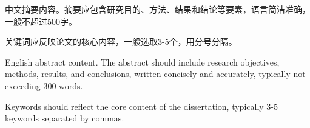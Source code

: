 \begin{cabstract}
中文摘要内容。摘要应包含研究目的、方法、结果和结论等要素，语言简洁准确，一般不超过500字。

关键词应反映论文的核心内容，一般选取3-5个，用分号分隔。
\end{cabstract}

\begin{eabstract}
English abstract content. The abstract should include research objectives, methods, results, and conclusions, written concisely and accurately, typically not exceeding 300 words.

Keywords should reflect the core content of the dissertation, typically 3-5 keywords separated by commas.
\end{eabstract}

